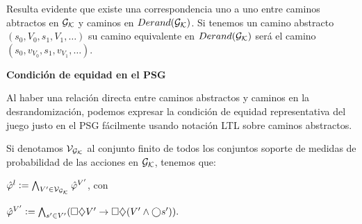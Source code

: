 Resulta evidente que existe una correspondencia uno a uno entre caminos
abtractos en $\mathcal{G}_{\mathcal{K}}$ y caminos en $Derand(\mathcal{G}_{\mathcal{K}})$. Si tenemos un camino abstracto $(s_0,
	V_0, s_1, V_1, \dots)$ su camino equivalente en $Derand(\mathcal{G}_{\mathcal{K}})$ será el camino $(s_0,
	v_{V_0}, s_1, v_{V_1}, \dots)$.

\textbf{Condición de equidad en el PSG}

Al haber una relación directa entre caminos abstractos y caminos en la
desrandomización, podemos expresar la condición de equidad representativa del
juego justo en el PSG fácilmente usando notación LTL sobre caminos abstractos.

Si denotamos $\mathcal{V}_{\mathcal{G}_{\mathcal{K}}}$ al conjunto finito de todos los conjuntos soporte de
medidas de probabilidad de las acciones en $\mathcal{G}_{\mathcal{K}}$, tenemos que:

\begin{center}
	$
		\hat \varphi^l := \bigwedge_{V' \in \mathcal{V}_{\mathcal{G}_{\mathcal{K}}}} \hat \varphi^{V'}
	$, con

	$
		\hat \varphi^{V'} := \bigwedge_{s' \in V'} (\square \diamondsuit V' \rightarrow \square \diamondsuit (V' \wedge \bigcirc s' )).
	$
\end{center}







